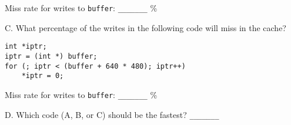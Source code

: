 \vspace{0.25in}

Miss rate for writes to {\tt buffer}: \verb|_______| \%

\vspace{0.25in}

C. What percentage of the writes in the following code will miss in the cache?

\begin{verbatim}
int *iptr;
iptr = (int *) buffer;
for (; iptr < (buffer + 640 * 480); iptr++)
    *iptr = 0;
\end{verbatim}

\vspace{0.25in}

Miss rate for writes to {\tt buffer}: \verb|_______| \%

\vspace{0.25in}

D. Which code (A, B, or C) should be the fastest?  \verb|_______|


